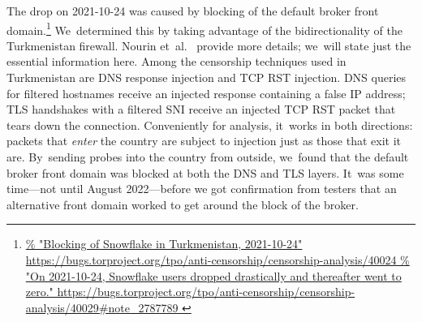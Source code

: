 \documentclass[letterpaper,twocolumn]{article}
\newlength{\urlfootnotesize}
\newcommand{\urlfootnote}[1]{\footnote{
\raggedright\hangindent\footnotemargin%
\fontsize{\urlfootnotesize}{\urlfootnotesize}\selectfont%
\url{#1}
}}
\begin{document}
The drop on \mbox{2021-10-24} was caused by
blocking of the default broker front domain.\urlfootnote{
https://bugs.torproject.org/tpo/anti-censorship/censorship-analysis/40024
}
We~determined this by
taking advantage of the bidirectionality of the Turkmenistan firewall.
Nourin et~al.~\cite[\S 2]{Nourin2023a} provide more details;
we~will state just the essential information here.
Among the censorship techniques used in Turkmenistan
are DNS response injection and TCP RST injection.
DNS queries for filtered hostnames receive an injected response
containing a false IP address;
TLS handshakes with a filtered SNI receive an injected TCP RST packet
that tears down the connection.
Conveniently for analysis,
it~works in both directions:
packets that \emph{enter} the country are subject to injection
just as those that exit it are.
By~sending probes into the country from outside,
we~found that the default broker front domain
was blocked at both the DNS and TLS layers.
It~was some time---not until August 2022---before we got
confirmation from testers that an alternative front domain
worked to get around the block of the broker.

\end{document}
